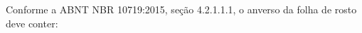 \documentclass[
12pt,				%
openany,			%
twoside,			%
a4paper,			%
english,			%
french,				%
spanish,			%
brazil,				%
]{abntex2}
\begin{document}

\frenchspacing 


\imprimircapa

\imprimirfolhaderosto*

\iffalse

    {
        \ABNTEXchapterfont

        \vspace*{\fill}

        Conforme a ABNT NBR 10719:2015, seção 4.2.1.1.1, o anverso da folha de rosto
        deve conter:

}
\end{document}
